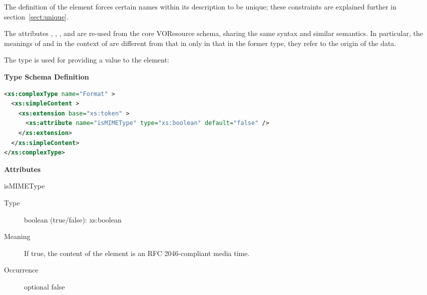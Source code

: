\documentclass[11pt,a4paper]{ivoa}
\begin{document}

The definition of the  element forces certain
names within its description to be unique; these constraints are explained
further in section~\ref{sect:unique}.



The attributes , , ,
and  are re-used from
the core VOResource schema, sharing the same syntax and similar
semantics.  In particular, the meanings of 
and  in the context of 
 are different from that in 
 only in that in the former type, they refer
to the origin of the data.



The  type is used for
providing a value to the  element:


\begin{generated}
\begingroup
      	\renewcommand*\descriptionlabel[1]{%
      	\hbox to 5.5em{\emph{#1}\hfil}}\vspace{1ex}\noindent\textbf{ Type Schema Definition}

\begin{lstlisting}[language=XML,basicstyle=\footnotesize]
<xs:complexType name="Format" >
  <xs:simpleContent >
    <xs:extension base="xs:token" >
      <xs:attribute name="isMIMEType" type="xs:boolean" default="false" />
    </xs:extension>
  </xs:simpleContent>
</xs:complexType>
\end{lstlisting}

\vspace{0.5ex}\noindent\textbf{ Attributes}

\begingroup\small\begin{bigdescription}
\item[isMIMEType]
\begin{description}
\item[Type] boolean (true/false): xs:boolean
\item[Meaning] 
                 If true, the content of the element is an RFC 
                 2046-compliant media time.
               
\item[Occurrence] optional
false
\end{description}


\end{bigdescription}\endgroup

\endgroup
\end{generated}
\end{document}
